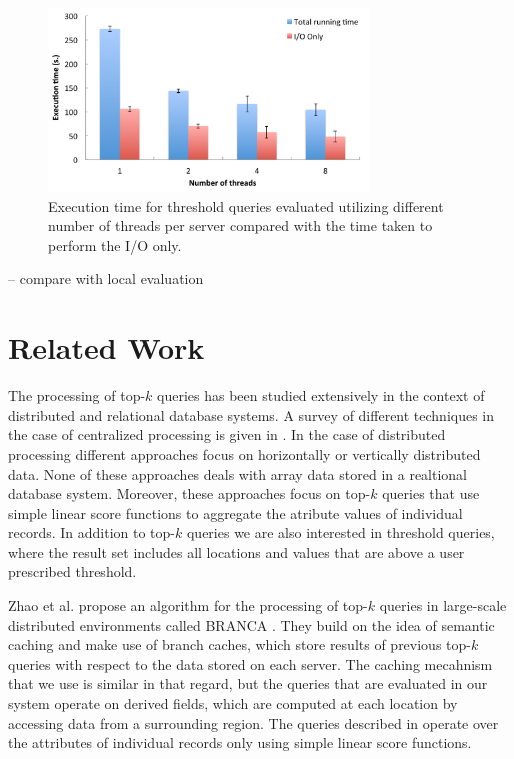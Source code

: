 \documentclass{sig-alternate}
\begin{document}
\begin{figure}
\centering
\includegraphics[width=3.35in]{Figures/io_comparison.pdf}
\caption{Execution time for threshold queries evaluated utilizing different number of
threads per server compared with the time taken to perform the I/O only.}
\label{fig:io_comparison}
\end{figure}

-- compare with local evaluation

\section{Related Work}
The processing of top-$k$ queries has been studied extensively in the context of distributed and relational database systems. A survey of different techniques
in the case of centralized processing is given in \cite{Ilyas}. In the case of distributed processing different approaches focus on horizontally 
\cite{Balke, Vlachou} or vertically \cite{Cao, Chaudhuri, Guntzer, Marian, Michel} distributed data. None of these approaches deals with array data stored in
a realtional database system. Moreover, these approaches focus on top-$k$ queries that use simple linear score functions to aggregate the atribute values of
individual records. In addition to top-$k$ queries we are also interested in threshold queries, where the result set includes all locations and values that are
above a user prescribed threshold. 

Zhao et al. propose an algorithm for the processing of top-$k$ queries in large-scale distributed environments called BRANCA \cite{Zhao}. They build on the 
idea of semantic caching \cite{Ren} and make use of branch caches, which store results of previous top-$k$ queries with respect to the data stored on each server.
The caching mecahnism that we use is similar in that regard, but the queries that are evaluated in our system operate on derived fields, which are computed
at each location by accessing data from a surrounding region. The queries described in \cite{Zhao} operate over the attributes of individual records only using
simple linear score functions.
\end{document}
